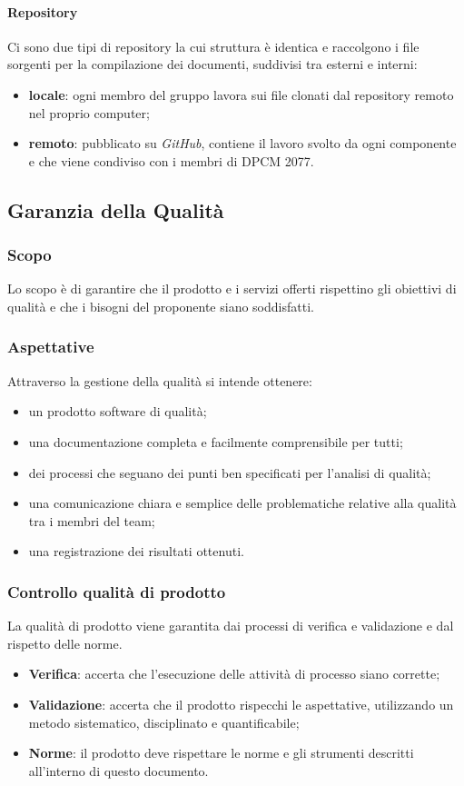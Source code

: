 			\paragraph{Repository}
			Ci sono due tipi di repository la cui struttura è identica e raccolgono i file sorgenti per la compilazione dei documenti, suddivisi tra esterni e interni:
			\begin{itemize}
		   			\item \textbf{locale}: ogni membro del gruppo lavora sui file clonati dal repository remoto nel proprio computer;
		   			\item \textbf{remoto}: pubblicato su \textit{GitHub}, contiene il lavoro svolto da ogni componente e che viene condiviso con i membri di DPCM 2077.
		   	\end{itemize}
		   	
	\subsection{Garanzia della Qualità}
		\subsubsection{Scopo}
		Lo scopo è di garantire che il prodotto e i servizi offerti rispettino gli obiettivi di qualità e che i bisogni del proponente siano soddisfatti.
		\subsubsection{Aspettative}
		Attraverso la gestione della qualità si intende ottenere:
		\begin{itemize}
			\item un prodotto software di qualità;
			\item una documentazione completa e facilmente comprensibile per tutti;
			\item dei processi che seguano dei punti ben specificati per l'analisi di qualità;
			\item una comunicazione chiara e semplice delle problematiche relative alla qualità tra i membri del team;
			\item una registrazione dei risultati ottenuti.
		\end{itemize}
		\subsubsection{Controllo qualità di prodotto}
		La qualità di prodotto viene garantita dai processi di verifica e validazione e dal rispetto delle norme.
		\begin{itemize}
			\item \textbf{Verifica}: accerta che l’esecuzione delle attività di processo siano corrette;
			\item \textbf{Validazione}: accerta che il prodotto rispecchi le aspettative, utilizzando un metodo sistematico, disciplinato e quantificabile;
			\item \textbf{Norme}:   il  prodotto  deve  rispettare  le  norme  e  gli  strumenti  descritti  all’interno  di  questo documento.
		\end{itemize}
